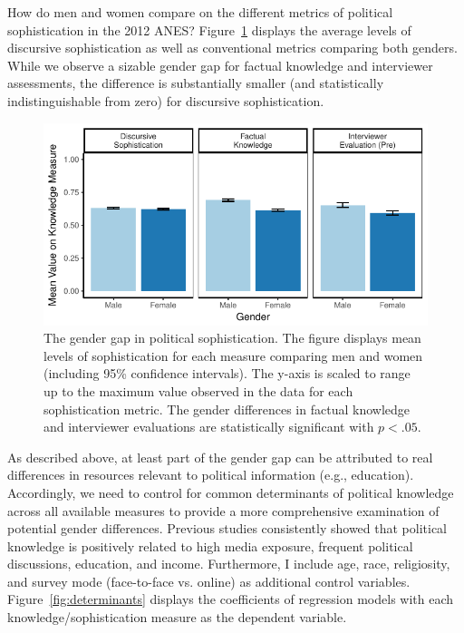 \documentclass[12pt]{article}
\begin{document}

How do men and women compare on the different metrics of political sophistication in the 2012 ANES? Figure~\ref{fig:meandiff} displays the average levels of discursive sophistication as well as conventional metrics comparing both genders. While we observe a sizable gender gap for factual knowledge and interviewer assessments, the difference is substantially smaller (and statistically indistinguishable from zero) for discursive sophistication. %

\begin{figure}[h]\centering
\includegraphics{../fig/meandiff_pres.pdf}
\caption{The gender gap in political sophistication. The figure displays mean levels of sophistication for each measure comparing men and women (including 95\% confidence intervals). The y-axis is scaled to range up to the maximum value observed in the data for each sophistication metric. The gender differences in factual knowledge and interviewer evaluations are statistically significant with $p<.05$.}\label{fig:meandiff}
\end{figure}

As described above, at least part of the gender gap can be attributed to real differences in resources relevant to political information (e.g., education). Accordingly, we need to control for common determinants of political knowledge across all available measures to provide a more comprehensive examination of potential gender differences. Previous studies consistently showed that political knowledge is positively related to high media exposure, frequent political discussions, education, and income. Furthermore, I include age, race, religiosity, and survey mode (face-to-face vs. online) as additional control variables. Figure~\ref{fig:determinants} displays the coefficients of regression models with each knowledge/sophistication measure as the dependent variable.
\end{document}
